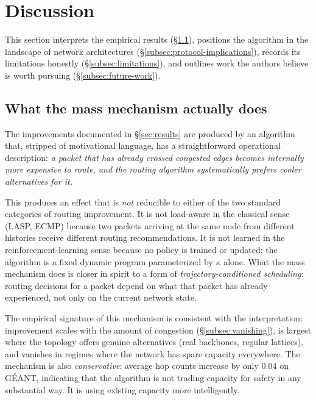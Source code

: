 
\section{Discussion}
\label{sec:discussion}

This section interprets the empirical results
(\S\ref{subsec:what-mass-does}), positions the algorithm in the
landscape of network architectures
(\S\ref{subsec:protocol-implications}), records its limitations
honestly (\S\ref{subsec:limitations}), and outlines work the
authors believe is worth pursuing
(\S\ref{subsec:future-work}).

\subsection{What the mass mechanism actually does}
\label{subsec:what-mass-does}

The improvements documented in \S\ref{sec:results} are produced by
an algorithm that, stripped of motivational language, has a
straightforward operational description:
\textit{a packet that has already crossed congested edges becomes
internally more expensive to route, and the routing algorithm
systematically prefers cooler alternatives for it.}

This produces an effect that is \emph{not} reducible to either of
the two standard categories of routing improvement. It is not
load-aware in the classical sense (LASP, ECMP) because two packets
arriving at the same node from different histories receive
different routing recommendations. It is not learned in the
reinforcement-learning sense because no policy is trained or
updated; the algorithm is a fixed dynamic program parameterized by
$\kappa$ alone. What the mass mechanism does is closer in spirit
to a form of \emph{trajectory-conditioned scheduling}: routing
decisions for a packet depend on what that packet has already
experienced, not only on the current network state.

The empirical signature of this mechanism is consistent with the
interpretation: improvement scales with the amount of congestion
(\S\ref{subsec:vanishing}), is largest where the topology offers
genuine alternatives (real backbones, regular lattices), and
vanishes in regimes where the network has spare capacity
everywhere. The mechanism is also \emph{conservative}: average
hop counts increase by only $0.04$ on GÉANT, indicating that
the algorithm is not trading capacity for safety in any
substantial way. It is using existing capacity more
intelligently.

